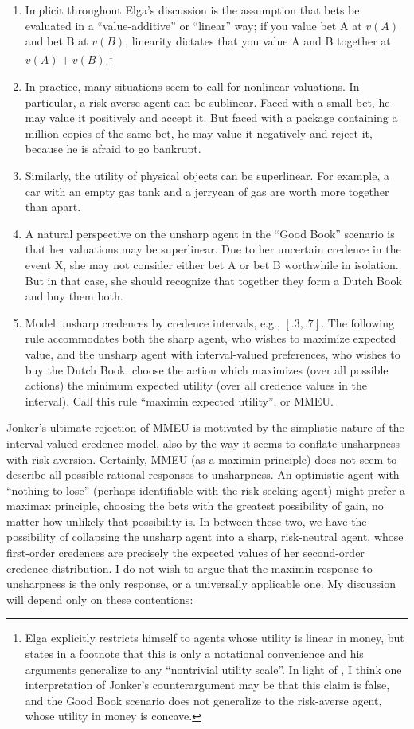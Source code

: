 \documentclass[letterpaper,12pt]{article}
\begin{document}
\begin{enumerate}
\item
Implicit throughout Elga's discussion is the assumption that bets be evaluated in a ``value-additive'' or ``linear'' way; if you value bet A at $v(A)$ and bet B at $v(B)$, linearity dictates that you value A and B together at $v(A) + v(B)$.\footnote{Elga explicitly restricts himself to agents whose utility is linear in money, but states in a footnote that this is only a notational convenience and his arguments generalize to any ``nontrivial utility scale''. In light of \cite{DBLP:journals/mp/Ahmed06}, I think one interpretation of Jonker's counterargument may be that this claim is false, and the Good Book scenario does not generalize to the risk-averse agent, whose utility in money is concave.}
\item
In practice, many situations seem to call for nonlinear valuations. In particular, a risk-averse agent can be sublinear. Faced with a small bet, he may value it positively and accept it. But faced with a package containing a million copies of the same bet, he may value it negatively and reject it, because he is afraid to go bankrupt.
\item
Similarly, the utility of physical objects can be superlinear. For example, a car with an empty gas tank and a jerrycan of gas are worth more together than apart.
\item
A natural perspective on the unsharp agent in the ``Good Book'' scenario is that her valuations may be superlinear. Due to her uncertain credence in the event X, she may not consider either bet A or bet B worthwhile in isolation. But in that case, she should recognize that together they form a Dutch Book and buy them both.
\item
Model unsharp credences by credence intervals, e.g., $[.3, .7]$. The following rule accommodates both the sharp agent, who wishes to maximize expected value, and the unsharp agent with interval-valued preferences, who wishes to buy the Dutch Book: choose the action which maximizes (over all possible actions) the minimum expected utility (over all credence values in the interval). Call this rule ``maximin expected utility'', or MMEU.
\end{enumerate}

Jonker's ultimate rejection of MMEU is motivated by the simplistic nature of the interval-valued credence model, also by the way it seems to conflate unsharpness with risk aversion. Certainly, MMEU (as a maximin principle) does not seem to describe all possible rational responses to unsharpness. An optimistic agent with ``nothing to lose'' (perhaps identifiable with the risk-seeking agent) might prefer a maximax principle, choosing the bets with the greatest possibility of gain, no matter how unlikely that possibility is. In between these two, we have the possibility of collapsing the unsharp agent into a sharp, risk-neutral agent, whose first-order credences are precisely the expected values of her second-order credence distribution. I do not wish to argue that the maximin response to unsharpness is the only response, or a universally applicable one. My discussion will depend only on these contentions:
\end{document}
